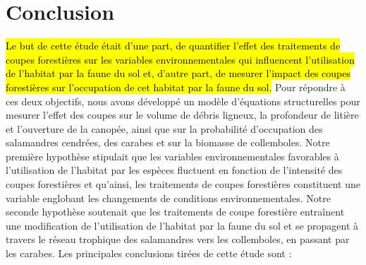 \chapter*{Conclusion}           %
\label{chap-conclusion}         %


\hl{Le but de cette étude était d'une part, de quantifier l'effet des traitements de coupes forestières sur les variables environnementales qui influencent 
l'utilisation de l'habitat par la faune du sol et, d'autre part, de mesurer l'impact des coupes forestières sur l'occupation de cet habitat par la faune du sol. }
Pour répondre à ces deux objectifs, nous avons développé un modèle d'équations structurelles pour mesurer l'effet des coupes sur le volume de débris ligneux, 
la profondeur de litière et l'ouverture de la canopée, ainsi que sur la probabilité d'occupation des salamandres cendrées, des carabes et sur la biomasse de collemboles.
Notre première hypothèse stipulait que les variables environnementales favorables à l'utilisation de l'habitat par les espèces fluctuent 
en fonction de l'intensité des coupes forestières et qu'ainsi, les traitements de coupes forestières constituent une variable englobant les changements de conditions environnementales. 
Notre seconde hypothèse soutenait que les traitements de coupe forestière entraînent une modification de l'utilisation de l'habitat par la faune du sol et se propagent à travers 
le réseau trophique des salamandres vers les collemboles, en passant par les carabes. 
Les principales conclusions tirées de cette étude sont :

